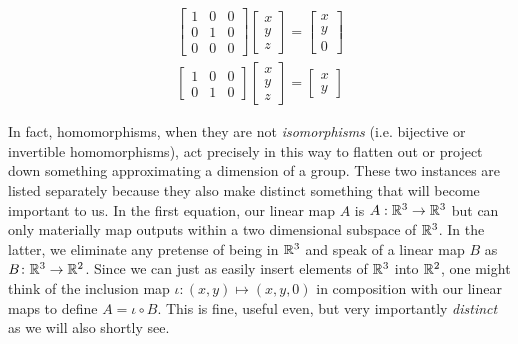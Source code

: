 \documentclass[11pt]{article}
\begin{document}
\begin{gather*}
\begin{bmatrix}
1 & 0 & 0 \\ 0 & 1 & 0 \\  0 & 0 & 0
\end{bmatrix}
\begin{bmatrix}
x \\ y \\ z
\end{bmatrix}
=
\begin{bmatrix}
x \\ y \\ 0
\end{bmatrix} \\[0.7em]
\begin{bmatrix}
1 & 0 & 0 \\ 0 & 1 & 0
\end{bmatrix}
\begin{bmatrix}
x \\ y \\ z
\end{bmatrix}
=
\begin{bmatrix}
x \\ y
\end{bmatrix}
\end{gather*}

In fact, homomorphisms, when they are not \emph{isomorphisms} (i.e. bijective or invertible homomorphisms), act precisely in this way to flatten out or project down something approximating a dimension of a group. These two instances are listed separately because they also make distinct something that will become important to us. In the first equation, our linear map $A$ is $A: \mathbb{R}^3 \to \mathbb{R}^3$ but can only materially map outputs within a two dimensional subspace of $\mathbb{R}^3$. In the latter, we eliminate any pretense of being in $\mathbb{R}^3$ and speak of a linear map $B$ as $B\colon \mathbb{R}^3 \to \mathbb{R}^2$. Since we can just as easily insert elements of $\mathbb{R}^3$ into $\mathbb{R}^2$, one might think of the inclusion map $\iota \colon (x,y) \mapsto (x,y,0)$ in composition with our linear maps to define $A = \iota \circ B$. This is fine, useful even, but very importantly \emph{distinct} as we will also shortly see.
\end{document}
